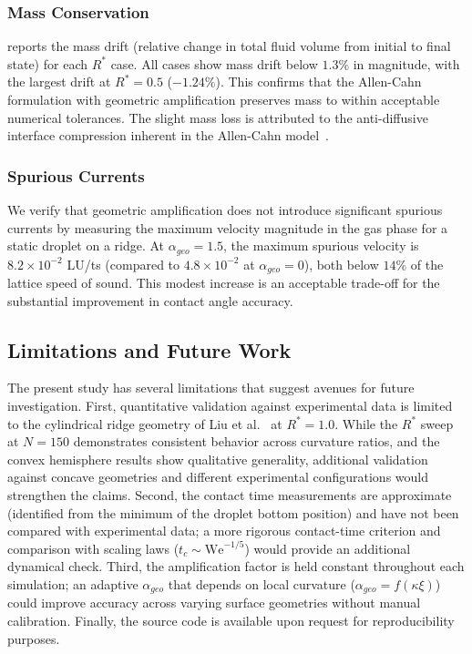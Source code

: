\subsubsection{Mass Conservation}

 reports the mass drift (relative change in total fluid volume from initial to final state) for each $R^*$ case. All cases show mass drift below $1.3\%$ in magnitude, with the largest drift at $R^* = 0.5$ ($-1.24\%$). This confirms that the Allen-Cahn formulation with geometric amplification preserves mass to within acceptable numerical tolerances. The slight mass loss is attributed to the anti-diffusive interface compression inherent in the Allen-Cahn model~\cite{fakhari2017improved}.

\subsubsection{Spurious Currents}

We verify that geometric amplification does not introduce significant spurious currents by measuring the maximum velocity magnitude in the gas phase for a static droplet on a ridge. At $\alpha_{geo}=1.5$, the maximum spurious velocity is $8.2 \times 10^{-2}$ LU/ts (compared to $4.8 \times 10^{-2}$ at $\alpha_{geo}=0$), both below $14\%$ of the lattice speed of sound. This modest increase is an acceptable trade-off for the substantial improvement in contact angle accuracy.

\subsection{Limitations and Future Work}

The present study has several limitations that suggest avenues for future investigation. First, quantitative validation against experimental data is limited to the cylindrical ridge geometry of Liu et al.~\cite{liu2015symmetry} at $R^*=1.0$. While the $R^*$ sweep at $N=150$ demonstrates consistent behavior across curvature ratios, and the convex hemisphere results show qualitative generality, additional validation against concave geometries and different experimental configurations would strengthen the claims. Second, the contact time measurements are approximate (identified from the minimum of the droplet bottom position) and have not been compared with experimental data; a more rigorous contact-time criterion and comparison with scaling laws ($t_c \sim \mathrm{We}^{-1/5}$) would provide an additional dynamical check. Third, the amplification factor is held constant throughout each simulation; an adaptive $\alpha_{geo}$ that depends on local curvature ($\alpha_{geo} = f(\kappa \xi)$) could improve accuracy across varying surface geometries without manual calibration. Finally, the source code is available upon request for reproducibility purposes.

